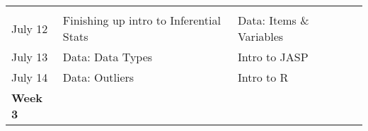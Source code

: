 \documentclass[
]{book}
\begin{document}
\begin{longtable}[]{@{}llll@{}}
\begin{minipage}[t]{0.29\columnwidth}
\strut
\end{minipage} & \begin{minipage}[t]{0.18\columnwidth}\raggedright
\strut
\end{minipage}\tabularnewline
\begin{minipage}[t]{0.09\columnwidth}\raggedright
July 12\strut
\end{minipage} & \begin{minipage}[t]{0.32\columnwidth}\raggedright
Finishing up intro to Inferential Stats\strut
\end{minipage} & \begin{minipage}[t]{0.29\columnwidth}\raggedright
Data: Items \& Variables\strut
\end{minipage} & \begin{minipage}[t]{0.18\columnwidth}\raggedright
\strut
\end{minipage}\tabularnewline
\begin{minipage}[t]{0.09\columnwidth}\raggedright
July 13\strut
\end{minipage} & \begin{minipage}[t]{0.32\columnwidth}\raggedright
Data: Data Types\strut
\end{minipage} & \begin{minipage}[t]{0.29\columnwidth}\raggedright
Intro to JASP\strut
\end{minipage} & \begin{minipage}[t]{0.18\columnwidth}\raggedright
\strut
\end{minipage}\tabularnewline
\begin{minipage}[t]{0.09\columnwidth}\raggedright
July 14\strut
\end{minipage} & \begin{minipage}[t]{0.32\columnwidth}\raggedright
Data: Outliers\strut
\end{minipage} & \begin{minipage}[t]{0.29\columnwidth}\raggedright
Intro to R\strut
\end{minipage} & \begin{minipage}[t]{0.18\columnwidth}\raggedright
\strut
\end{minipage}\tabularnewline
\begin{minipage}[t]{0.09\columnwidth}\raggedright
\textbf{Week 3}\strut
\end{minipage} & \begin{minipage}[t]{0.32\columnwidth}\raggedright
\strut
\end{minipage} & \begin{minipage}[t]{0.29\columnwidth}\raggedright

\end{minipage}
\end{longtable}
\end{document}
